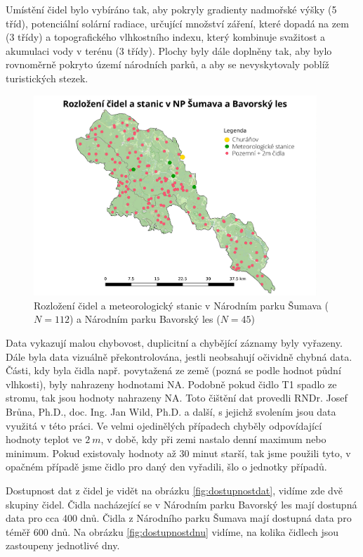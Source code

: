 Umístění čidel bylo vybíráno tak, aby pokryly gradienty nadmořské výšky (5 tříd), potenciální solární radiace, určující množství záření, které dopadá na zem (3 třídy) a topografického vlhkostního indexu, který kombinuje svažitost a akumulaci vody v terénu (3 třídy). Plochy byly dále doplněny tak, aby bylo rovnoměrně pokryto území národních parků, a aby se nevyskytovaly poblíž turistických stezek.

\begin{figure}
	\centering
	\includegraphics[width=0.95\textwidth]{img/rozlozenicidel.pdf}
	\caption{Rozložení čidel a meteorologický stanic v Národním parku Šumava ($N=112$) a Národním parku Bavorský les ($N=45$)}
	\label{fig:rozlozenicidel}
\end{figure}

Data vykazují malou chybovost, duplicitní a chybějící záznamy byly vyřazeny. Dále byla data vizuálně překontrolována, jestli neobsahují očividně chybná data. Části, kdy byla čidla např. povytažená ze země (pozná se podle hodnot půdní vlhkosti), byly nahrazeny hodnotami NA. Podobně pokud čidlo T1 spadlo ze stromu, tak jsou hodnoty nahrazeny NA. Toto čištění dat provedli RNDr. Josef Brůna, Ph.D., doc. Ing. Jan Wild, Ph.D. a další, s jejichž svolením jsou data využitá v této práci. Ve velmi ojedinělých případech chyběly odpovídající hodnoty teplot ve $\SI{2}{m}$, v době, kdy při zemi nastalo denní maximum nebo minimum. Pokud existovaly hodnoty až 30 minut starší, tak jsme použili tyto, v opačném případě jsme čidlo pro daný den vyřadili, šlo o jednotky případů.

Dostupnost dat z čidel je vidět na obrázku \ref{fig:dostupnostdat}, vidíme zde dvě skupiny čidel. Čidla nacházející se v Národním parku Bavorský les mají dostupná data pro cca 400 dnů. Čidla z Národního parku Šumava mají dostupná data pro téměř 600 dnů. Na obrázku \ref{fig:dostupnostdnu} vidíme, na kolika čidlech jsou zastoupeny jednotlivé dny.

